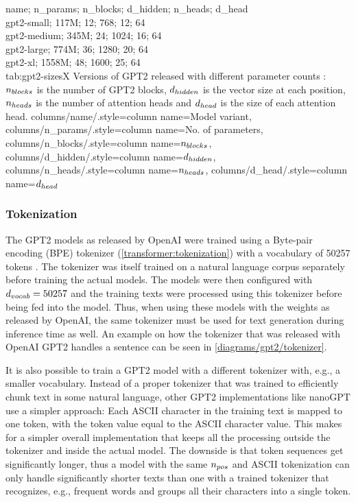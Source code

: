 {
	name; n_params; n_blocks; d_hidden; n_heads; d_head\\
	gpt2-small; 117M; 12; 768; 12; 64 \\
	gpt2-medium; 345M; 24; 1024; 16; 64 \\
	gpt2-large; 774M; 36; 1280; 20; 64 \\
	gpt2-xl; 1558M; 48; 1600; 25; 64 \\
}
{tab:gpt2-sizesX}
{
	Versions of GPT2 released with different parameter counts \cite{hfpretrained}: ${n_{blocks}}$ is the number of GPT2 blocks, ${d_{hidden}}$ is the vector size at each position, ${n_{heads}}$ is the number of attention heads and ${d_{head}}$ is the size of each attention head.
}
{%
	columns/name/.style={column name={Model variant}},
	columns/n_params/.style={column name={No. of parameters}},
	columns/n_blocks/.style={column name={${n_{blocks}}$}},
	columns/d_hidden/.style={column name={${d_{hidden}}$}},
	columns/n_heads/.style={column name={${n_{heads}}$}},
	columns/d_head/.style={column name={${d_{head}}$}}
}


\subsubsection{Tokenization}

\label{gpt2:tokenizer}

The GPT2 models as released by OpenAI were trained using a Byte-pair encoding (BPE) tokenizer (\cref{transformer:tokenization}) with a vocabulary of 50257 tokens  \cite{HuggingFaceGPT2}. The tokenizer was itself trained on a natural language corpus separately before training the actual models. The models were then configured with ${d_{vocab}}=50257$ and the training texts were processed using this tokenizer before being fed into the model. Thus, when using these models with the weights as released by OpenAI, the same tokenizer must be used for text generation during inference time as well. An example on how the tokenizer that was released with OpenAI GPT2 handles a sentence can be seen in \cref{diagrams/gpt2/tokenizer}.

It is also possible to train a GPT2 model with a different tokenizer with, e.g., a smaller vocabulary. Instead of a proper tokenizer that was trained to efficiently chunk text in some natural language, other GPT2 implementations like nanoGPT \cite{nanogpt} use a simpler approach: Each ASCII character in the training text is mapped to one token, with the token value equal to the ASCII character value.
This makes for a simpler overall implementation that keeps all the processing outside the tokenizer and inside the actual model.
The downside is that token sequences get significantly longer, thus a model with the same ${n_{pos}}$ and ASCII tokenization can only handle significantly shorter texts than one with a trained tokenizer that recognizes, e.g., frequent words and groups all their characters into a single token.

